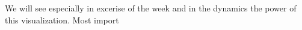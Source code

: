 We will see especially in excerise of the week and in the dynamics the power of this visualization. Most import